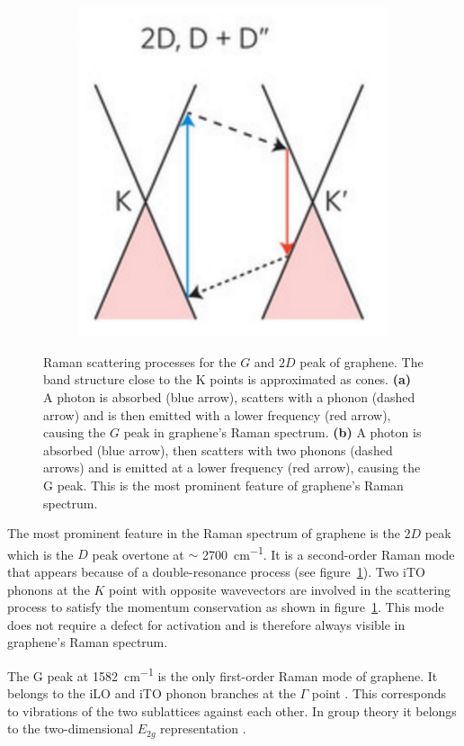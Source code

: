\begin{figure}[!h]
\begin{subfigure}{0.2\textwidth}
  \end{subfigure}
  ~
  \begin{subfigure}{0.45\textwidth}
    \includegraphics[width=\textwidth]{./images/2d-mode.png}
  \end{subfigure}
  \caption{Raman scattering processes for the $G$ and $2D$ peak of graphene. The band structure close to the K points is approximated as cones. \textbf{(a)} A photon is absorbed (blue arrow), scatters with a phonon (dashed arrow) and is then emitted with a lower frequency (red arrow), causing the $G$ peak in graphene's Raman spectrum. \textbf{(b)} A photon is absorbed (blue arrow), then scatters with two phonons (dashed arrows) and is emitted at a lower frequency (red arrow), causing the G peak. This is the most prominent feature of graphene's Raman spectrum. }
  \label{fig:raman-modes}
\end{figure}

The most prominent feature in the Raman spectrum of graphene is the $2D$ peak which is the $D$ peak overtone at $\sim$ \SI{2700}{cm^{-1}}. It is a second-order Raman mode that appears because of a double-resonance process (see figure~\ref{fig:raman-modes}). Two iTO phonons at the $K$ point with opposite wavevectors are involved in the scattering process to satisfy the momentum conservation as shown in figure~\ref{fig:raman-modes}. This mode does not require a defect for activation and is therefore always visible in graphene's Raman spectrum.

The G peak at \SI{1582}{cm^{-1}} is the only first-order Raman mode of graphene. It belongs to the iLO and iTO phonon branches at the $\Gamma$ point \mcite. This corresponds to vibrations of the two sublattices against each other. In group theory it belongs to the two-dimensional $E_{2g}$ representation \mcite.

